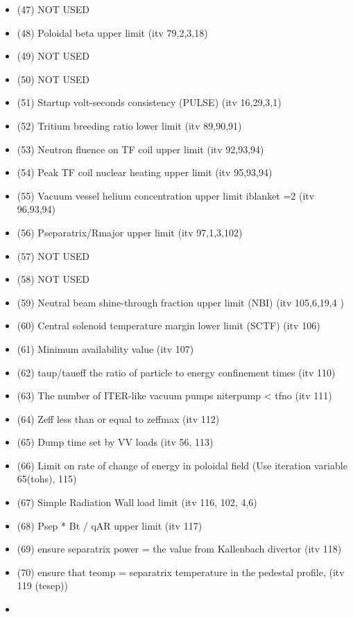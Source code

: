 \documentclass[
]{article}
\begin{document}
\begin{itemize}
\begin{itemize}
  \item
    (47) NOT USED
  \item
    (48) Poloidal beta upper limit (itv 79,2,3,18)
  \item
    (49) NOT USED
  \item
    (50) NOT USED
  \item
    (51) Startup volt-seconds consistency (PULSE) (itv 16,29,3,1)
  \item
    (52) Tritium breeding ratio lower limit (itv 89,90,91)
  \item
    (53) Neutron fluence on TF coil upper limit (itv 92,93,94)
  \item
    (54) Peak TF coil nuclear heating upper limit (itv 95,93,94)
  \item
    (55) Vacuum vessel helium concentration upper limit iblanket =2 (itv
    96,93,94)
  \item
    (56) Pseparatrix/Rmajor upper limit (itv 97,1,3,102)
  \item
    (57) NOT USED
  \item
    (58) NOT USED
  \item
    (59) Neutral beam shine-through fraction upper limit (NBI) (itv
    105,6,19,4 )
  \item
    (60) Central solenoid temperature margin lower limit (SCTF) (itv
    106)
  \item
    (61) Minimum availability value (itv 107)
  \item
    (62) taup/taueff the ratio of particle to energy confinement times
    (itv 110)
  \item
    (63) The number of ITER-like vacuum pumps niterpump \textless{} tfno
    (itv 111)
  \item
    (64) Zeff less than or equal to zeffmax (itv 112)
  \item
    (65) Dump time set by VV loads (itv 56, 113)
  \item
    (66) Limit on rate of change of energy in poloidal field (Use
    iteration variable 65(tohs), 115)
  \item
    (67) Simple Radiation Wall load limit (itv 116, 102, 4,6)
  \item
    (68) Psep * Bt / qAR upper limit (itv 117)
  \item
    (69) ensure separatrix power = the value from Kallenbach divertor
    (itv 118)
  \item
    (70) ensure that teomp = separatrix temperature in the pedestal
    profile, (itv 119 (tesep))
  \item

\end{itemize}
\end{itemize}
\end{document}
